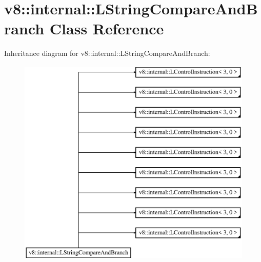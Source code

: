 \hypertarget{classv8_1_1internal_1_1_l_string_compare_and_branch}{}\section{v8\+:\+:internal\+:\+:L\+String\+Compare\+And\+Branch Class Reference}
\label{classv8_1_1internal_1_1_l_string_compare_and_branch}
Inheritance diagram for v8\+:\+:internal\+:\+:L\+String\+Compare\+And\+Branch\+:\begin{figure}[H]
\begin{center}
\leavevmode
\includegraphics[height=10.000000cm]{classv8_1_1internal_1_1_l_string_compare_and_branch}
\end{center}
\end{figure}
